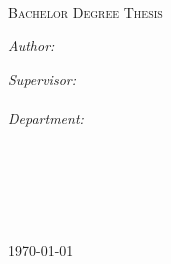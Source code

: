 
\begin{titlepage}
\begin{center}

\vspace*{3cm}

\HRule \\[0.4cm] %
{\huge \bfseries \ttitle}\\ %
\HRule \\[1.5cm] %

\Large{\textsc{Bachelor Degree Thesis}}\\[3cm] %

\begin{minipage}[t]{0.45\textwidth}
	\begin{flushleft} \large
		\emph{Author:}\\
		\authornames %
		\vspace{1cm}
	\end{flushleft}
\end{minipage}
\begin{minipage}[t]{0.45\textwidth}
	\begin{flushright} \large
		\emph{Supervisor:} \\
		\supname\\ %
		\emph{Department:}\\
		\textsc{\supdept}
	\end{flushright}
\end{minipage}\\[2.5cm]

\Large \textsc{\degreename}\\
\large \textit{\textsc{\major}}\\[1cm] %

\textsc{\large \facname}\\ %
\textsc{\large \univname}\\[1cm] %

{\large \today}\\ %

\vfill
\end{center}

\end{titlepage}

\clearpage %
